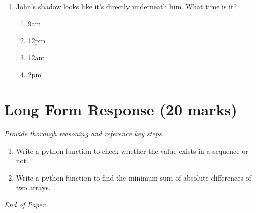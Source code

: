 \documentclass[12pt]{article}
\begin{document}
\begin{enumerate}[label=\arabic*.]
\begin{enumerate}[label=(\alph*)]
    \item buildings
    \item oceans
\end{enumerate}
\item John's shadow looks like it's directly underneath him. What time is it?
\begin{enumerate}[label=(\alph*)]
    \item 9am
    \item 12pm
    \item 12am
    \item 2pm
\end{enumerate}
\end{enumerate}

\section*{Long Form Response (20 marks)}
\textit{Provide thorough reasoning and reference key steps.}
\begin{enumerate}[label=\arabic*.]
\item Write a python function to check whether the value exists in a sequence or not.
\item Write a python function to find the minimum sum of absolute differences of two arrays.
\end{enumerate}

\vfill
\noindent\textit{End of Paper}
\end{document}
